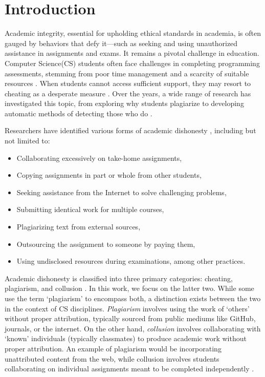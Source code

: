 \section{Introduction} \label{sec:intro}

Academic integrity, essential for upholding ethical standards in academia, is often gauged by behaviors that defy it—such as seeking and using unauthorized assistance in assignments and exams. It remains a pivotal challenge in education. Computer Science(CS) students often face challenges in completing programming assessments, stemming from poor time management and a scarcity of suitable resources \cite{10.5555/858403.858418}. When students cannot access sufficient support, they may resort to cheating as a desperate measure \cite{10.1145/3059009.3059065, 10.1145/1632149.1632168}. Over the years, a wide range of research has investigated this topic, from exploring why students plagiarize to developing automatic methods of detecting those who do \cite{10.5120/ijca2015906113}.

Researchers have identified various forms of academic dishonesty \cite{40db574cf24f441d994cbb1cd909bd1f}, including but not limited to:

\begin{itemize}
    \item Collaborating excessively on take-home assignments,
    \item Copying assignments in part or whole from other students,
    \item Seeking assistance from the Internet to solve challenging problems,
    \item Submitting identical work for multiple courses,
    \item Plagiarizing text from external sources,
    \item Outsourcing the assignment to someone by paying them,
    \item Using undisclosed resources during examinations, among other practices.
\end{itemize} 

Academic dishonesty is classified into three primary categories: cheating, plagiarism, and collusion \cite{8937362}. In this work, we focus on the latter two. While some use the term `plagiarism' to encompass both, a distinction exists between the two in the context of CS disciplines. \textit{Plagiarism} involves using the work of `others' without proper attribution, typically sourced from public mediums like GitHub, journals, or the internet. On the other hand, \textit{collusion} involves collaborating with `known' individuals (typically classmates) to produce academic work without proper attribution. An example of plagiarism would be incorporating unattributed content from the web, while collusion involves students collaborating on individual assignments meant to be completed independently \cite{Owunwanne, Fraser2014CollaborationCA,JonesJuliet}.

